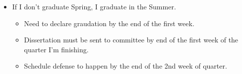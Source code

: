 \documentclass{article}
\begin{document}
\begin{itemize}
    \begin{itemize}
      \item If I don't graduate Spring, I graduate in the Summer.
        \begin{itemize}
          \item Need to declare graudation by the end of the first week.
          \item Dissertation must be sent to committee by end of the first week of the quarter I'm finishing.
          \item Schedule defense to happen by the end of the 2nd week of quarter.
        \end{itemize}
    \end{itemize}
\end{itemize}
\end{document}
